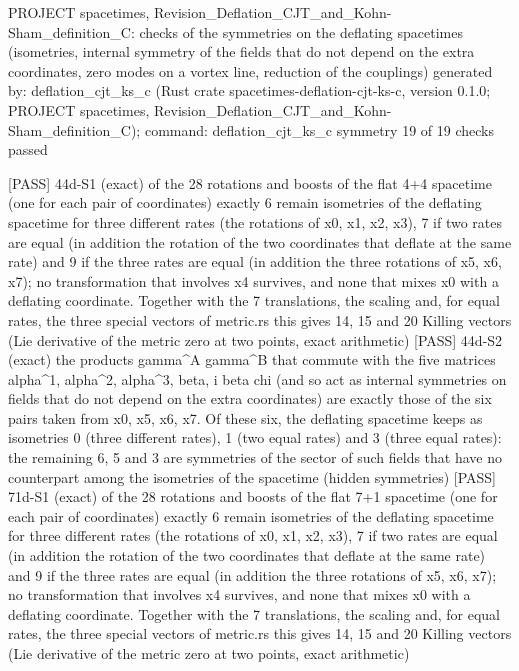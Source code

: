 \documentclass[
  10pt,
]{article}
\newenvironment{Shaded}{}{}
\newcommand{\NormalTok}[1]{#1}
\begin{document}
\begin{Shaded}
\begin{Highlighting}[]
\NormalTok{PROJECT spacetimes, Revision\_Deflation\_CJT\_and\_Kohn{-}Sham\_definition\_C: checks of the symmetries on the deflating spacetimes (isometries, internal symmetry of the fields that do not depend on the extra coordinates, zero modes on a vortex line, reduction of the couplings)}
\NormalTok{generated by: deflation\_cjt\_ks\_c (Rust crate spacetimes{-}deflation{-}cjt{-}ks{-}c, version 0.1.0; PROJECT spacetimes, Revision\_Deflation\_CJT\_and\_Kohn{-}Sham\_definition\_C); command: deflation\_cjt\_ks\_c symmetry}
\NormalTok{19 of 19 checks passed}

\NormalTok{[PASS] 44d{-}S1  (exact) of the 28 rotations and boosts of the flat 4+4 spacetime (one for each pair of coordinates) exactly 6 remain isometries of the deflating spacetime for three different rates (the rotations of x0, x1, x2, x3), 7 if two rates are equal (in addition the rotation of the two coordinates that deflate at the same rate) and 9 if the three rates are equal (in addition the three rotations of x5, x6, x7); no transformation that involves x4 survives, and none that mixes x0 with a deflating coordinate. Together with the 7 translations, the scaling and, for equal rates, the three special vectors of metric.rs this gives 14, 15 and 20 Killing vectors (Lie derivative of the metric zero at two points, exact arithmetic)}
\NormalTok{[PASS] 44d{-}S2  (exact) the products gamma\^{}A gamma\^{}B that commute with the five matrices alpha\^{}1, alpha\^{}2, alpha\^{}3, beta, i beta chi (and so act as internal symmetries on fields that do not depend on the extra coordinates) are exactly those of the six pairs taken from x0, x5, x6, x7. Of these six, the deflating spacetime keeps as isometries 0 (three different rates), 1 (two equal rates) and 3 (three equal rates): the remaining 6, 5 and 3 are symmetries of the sector of such fields that have no counterpart among the isometries of the spacetime (hidden symmetries)}
\NormalTok{[PASS] 71d{-}S1  (exact) of the 28 rotations and boosts of the flat 7+1 spacetime (one for each pair of coordinates) exactly 6 remain isometries of the deflating spacetime for three different rates (the rotations of x0, x1, x2, x3), 7 if two rates are equal (in addition the rotation of the two coordinates that deflate at the same rate) and 9 if the three rates are equal (in addition the three rotations of x5, x6, x7); no transformation that involves x4 survives, and none that mixes x0 with a deflating coordinate. Together with the 7 translations, the scaling and, for equal rates, the three special vectors of metric.rs this gives 14, 15 and 20 Killing vectors (Lie derivative of the metric zero at two points, exact arithmetic)}

\end{Highlighting}
\end{Shaded}
\end{document}
